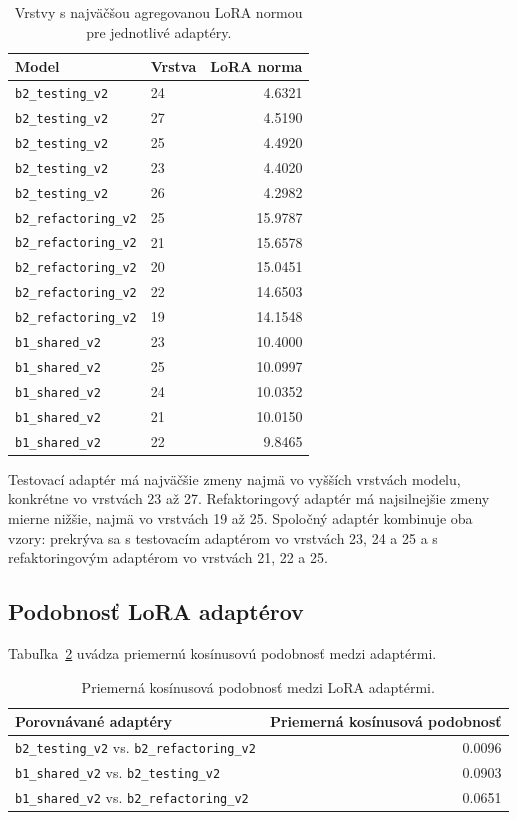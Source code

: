 \documentclass[11pt,a4paper]{article}
\newcommand{\modeltest}{\texttt{b2\_testing\_v2}}
\newcommand{\modelref}{\texttt{b2\_refactoring\_v2}}
\newcommand{\modelshared}{\texttt{b1\_shared\_v2}}
\begin{document}
\begin{table}[h]
\centering
\small
\begin{tabular}{llr}
\toprule
Model & Vrstva & LoRA norma \\
\midrule
\modeltest & 24 & 4.6321 \\
\modeltest & 27 & 4.5190 \\
\modeltest & 25 & 4.4920 \\
\modeltest & 23 & 4.4020 \\
\modeltest & 26 & 4.2982 \\
\midrule
\modelref & 25 & 15.9787 \\
\modelref & 21 & 15.6578 \\
\modelref & 20 & 15.0451 \\
\modelref & 22 & 14.6503 \\
\modelref & 19 & 14.1548 \\
\midrule
\modelshared & 23 & 10.4000 \\
\modelshared & 25 & 10.0997 \\
\modelshared & 24 & 10.0352 \\
\modelshared & 21 & 10.0150 \\
\modelshared & 22 & 9.8465 \\
\bottomrule
\end{tabular}
\caption{Vrstvy s najväčšou agregovanou LoRA normou pre jednotlivé adaptéry.}
\label{tab:lora-top-layers}
\end{table}

Testovací adaptér má najväčšie zmeny najmä vo vyšších vrstvách modelu, konkrétne vo vrstvách 23 až 27. Refaktoringový adaptér má najsilnejšie zmeny mierne nižšie, najmä vo vrstvách 19 až 25. Spoločný adaptér kombinuje oba vzory: prekrýva sa s testovacím adaptérom vo vrstvách 23, 24 a 25 a s refaktoringovým adaptérom vo vrstvách 21, 22 a 25.

\subsection{Podobnosť LoRA adaptérov}

Tabuľka~\ref{tab:lora-similarity} uvádza priemernú kosínusovú podobnosť medzi adaptérmi.

\begin{table}[h]
\centering
\small
\begin{tabular}{lr}
\toprule
Porovnávané adaptéry & Priemerná kosínusová podobnosť \\
\midrule
\modeltest{} vs. \modelref & 0.0096 \\
\modelshared{} vs. \modeltest & 0.0903 \\
\modelshared{} vs. \modelref & 0.0651 \\
\bottomrule
\end{tabular}
\caption{Priemerná kosínusová podobnosť medzi LoRA adaptérmi.}
\label{tab:lora-similarity}
\end{table}
\end{document}
